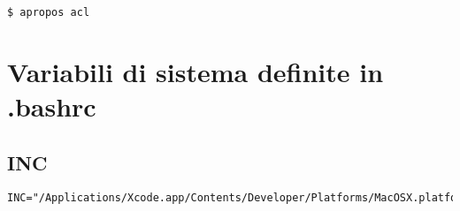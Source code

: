 \begin{lstlisting}
$ apropos acl
\end{lstlisting}



\section{Variabili di sistema definite in .bashrc}

\subsection{INC}

\begin{lstlisting}
INC="/Applications/Xcode.app/Contents/Developer/Platforms/MacOSX.platform/Developer/SDKs/MacOSX.sdk/usr/include/"
\end{lstlisting}

